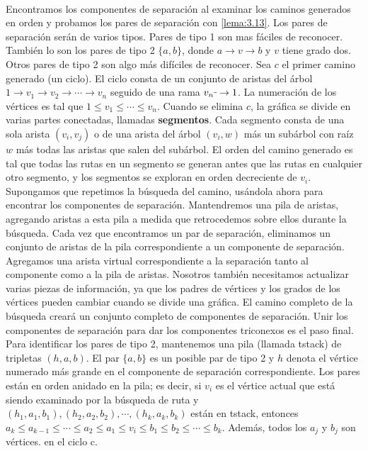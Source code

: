 \paragraph{}
Encontramos los componentes de separación al examinar los caminos generados en orden y probamos los pares de separación con \ref{lema:3.13}. Los pares de separación serán de varios tipos. Pares de tipo 1 son mas fáciles de reconocer. También lo son los pares de tipo 2 $\{a, b\}$, donde $a \rightarrow v \rightarrow b$ y $v$ tiene grado dos. Otros pares de tipo 2 son algo más difíciles de reconocer. Sea $c$ el primer camino generado (un ciclo). El ciclo consta de un conjunto de aristas del árbol $1 \rightarrow v_{1} \rightarrow v_{2} \rightarrow \cdots \rightarrow v_{n}$ seguido de una rama $v_{n} \rule[1mm]{.1cm}{0.4pt} \rightarrow 1$. La numeración de los vértices es tal que $1 \le v_{1} \le \cdots \le v_{n}$. Cuando se elimina $c$, la gráfica se divide en varias partes conectadas, llamadas \textbf{segmentos}. Cada segmento consta de una sola arista $\left(v_{i}, v_{j}\right)$ o de una arista del árbol $\left(v_{i}, w\right)$ más un subárbol con raíz $w$ más todas las aristas que salen del subárbol. El orden del camino generado es tal que todas las rutas en un segmento se generan antes que las rutas en cualquier otro segmento, y los segmentos se exploran en orden decreciente de $v_{i}$.\\
Supongamos que repetimos la búsqueda del camino, usándola ahora para encontrar los componentes de separación. Mantendremos una pila de aristas, agregando aristas a esta pila a medida que retrocedemos sobre ellos durante la búsqueda. Cada vez que encontramos un par de separación, eliminamos un conjunto de aristas de la pila correspondiente a un componente de separación. Agregamos una arista virtual correspondiente a la separación tanto al componente como a la pila de aristas. Nosotros también necesitamos actualizar varias piezas de información, ya que los padres de vértices y los grados de los vértices pueden cambiar cuando se divide una gráfica. El camino completo de la búsqueda creará un conjunto completo de componentes de separación. Unir los componentes de separación para dar los componentes triconexos es el paso final.\\
Para identificar los pares de tipo 2, mantenemos una pila (llamada tstack) de tripletas $\left(h, a, b\right)$. El par $\{a, b\}$ es un posible par de tipo 2 y $h$ denota el vértice numerado más grande en el componente de separación correspondiente. Los pares están en orden anidado en la pila; es decir, si $v_{i}$ es el vértice actual que está siendo examinado por la búsqueda de ruta y $\left(h_{1}, a_{1}, b_{1}\right), \left(h_{2}, a_{2}, b_{2}\right), \cdots, \left(h_{k}, a_{k}, b_{k}\right)$ están en tstack, entonces $a_{k} \leq a_{k-1} \leq \cdots \leq a_{2} \leq a_{1} \leq v_{i} \leq b_{1} \leq b_{2} \leq \cdots \leq b_{k}$. Además, todos los $a_{j}$ y $b_{j}$ son vértices. en el ciclo c.\\

